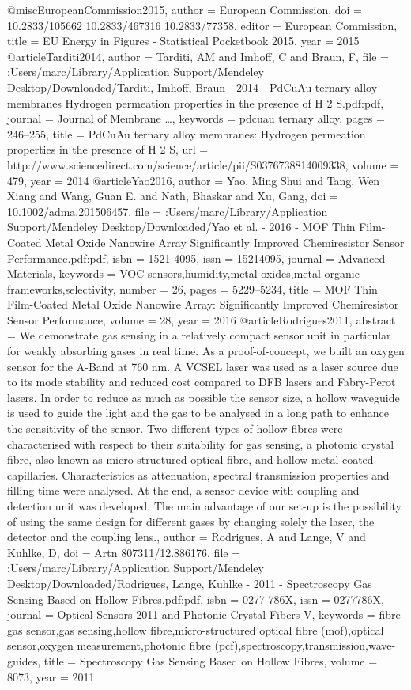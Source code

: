 @misc{EuropeanCommission2015,
author = {{European Commission}},
doi = {10.2833/105662
10.2833/467316
10.2833/77358},
editor = {{European Commission}},
title = {{EU Energy in Figures - Statistical Pocketbook 2015}},
year = {2015}
}
@article{Tarditi2014,
author = {Tarditi, AM and Imhoff, C and Braun, F},
file = {:Users/marc/Library/Application Support/Mendeley Desktop/Downloaded/Tarditi, Imhoff, Braun - 2014 - PdCuAu ternary alloy membranes Hydrogen permeation properties in the presence of H 2 S.pdf:pdf},
journal = {Journal of Membrane  {\ldots}},
keywords = {pdcuau ternary alloy},
pages = {246--255},
title = {{PdCuAu ternary alloy membranes: Hydrogen permeation properties in the presence of H 2 S}},
url = {http://www.sciencedirect.com/science/article/pii/S0376738814009338},
volume = {479},
year = {2014}
}
@article{Yao2016,
author = {Yao, Ming Shui and Tang, Wen Xiang and Wang, Guan E. and Nath, Bhaskar and Xu, Gang},
doi = {10.1002/adma.201506457},
file = {:Users/marc/Library/Application Support/Mendeley Desktop/Downloaded/Yao et al. - 2016 - MOF Thin Film-Coated Metal Oxide Nanowire Array Significantly Improved Chemiresistor Sensor Performance.pdf:pdf},
isbn = {1521-4095},
issn = {15214095},
journal = {Advanced Materials},
keywords = {VOC sensors,humidity,metal oxides,metal-organic frameworks,selectivity},
number = {26},
pages = {5229--5234},
title = {{MOF Thin Film-Coated Metal Oxide Nanowire Array: Significantly Improved Chemiresistor Sensor Performance}},
volume = {28},
year = {2016}
}
@article{Rodrigues2011,
abstract = {We demonstrate gas sensing in a relatively compact sensor unit in particular for weakly absorbing gases in real time. As a proof-of-concept, we built an oxygen sensor for the A-Band at 760 nm. A VCSEL laser was used as a laser source due to its mode stability and reduced cost compared to DFB lasers and Fabry-Perot lasers. In order to reduce as much as possible the sensor size, a hollow waveguide is used to guide the light and the gas to be analysed in a long path to enhance the sensitivity of the sensor. Two different types of hollow fibres were characterised with respect to their suitability for gas sensing, a photonic crystal fibre, also known as micro-structured optical fibre, and hollow metal-coated capillaries. Characteristics as attenuation, spectral transmission properties and filling time were analysed. At the end, a sensor device with coupling and detection unit was developed. The main advantage of our set-up is the possibility of using the same design for different gases by changing solely the laser, the detector and the coupling lens.},
author = {Rodrigues, A and Lange, V and Kuhlke, D},
doi = {Artn 807311/12.886176},
file = {:Users/marc/Library/Application Support/Mendeley Desktop/Downloaded/Rodrigues, Lange, Kuhlke - 2011 - Spectroscopy Gas Sensing Based on Hollow Fibres.pdf:pdf},
isbn = {0277-786X},
issn = {0277786X},
journal = {Optical Sensors 2011 and Photonic Crystal Fibers V},
keywords = {fibre gas sensor,gas sensing,hollow fibre,micro-structured optical fibre (mof),optical sensor,oxygen measurement,photonic fibre (pcf),spectroscopy,transmission,wave-guides},
title = {{Spectroscopy Gas Sensing Based on Hollow Fibres}},
volume = {8073},
year = {2011}
}
